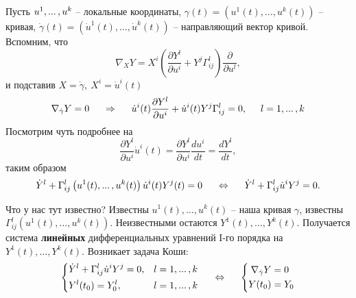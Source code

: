 Пусть $\set{u}{k}$ -- локальные координаты, $\gamma(t) = \left(u^1(t),\ldots,u^k(t)\right)$ -- кривая, $\dot{\gamma}(t) = \left(
    \dot{u}^1(t), \ldots, \dot{u}^k(t)
\right)$ -- направляющий вектор кривой. Вспомним, что
\begin{equation*}
    \nabla_X Y = 
    X^i \left(
        \frac{\partial Y^l}{\partial u^i} + Y^j \Gamma_{ij}^l
    \right) \frac{\partial }{\partial u^l},
\end{equation*}
и подставив $X = \dot{\gamma}, \ X^i = \dot{u}^i (t)$
\begin{equation*}
    \nabla_{\dot{\gamma}} Y = 0
    \hspace{0.5cm} \Rightarrow \hspace{0.5cm} 
    \dot{u}^i (t) \frac{\partial Y^l}{\partial u^i} + \dot{u}^i (t) Y^j \Gamma_{ij}^{l} = 0, \hspace{0.5cm} l = 1, \ldots, k
\end{equation*}
Посмотрим чуть подробнее на
\begin{equation*}
    \frac{\partial Y^l}{\partial u^i}  \dot{u}^i (t) = 
    \frac{\partial Y^l}{\partial u^i} \frac{d u^i}{d t} =
    \frac{d Y^l}{dt}, 
\end{equation*}
таким образом
\begin{equation}
    \dot{Y}^l + \Gamma_{ij}^{l} \left(
         u^1(t), \ldots, u^k(t)
    \right) \dot{u}^i (t) Y^j (t) = 0
    \hspace{0.5cm} \Leftrightarrow \hspace{0.5cm} 
    \dot{Y}^l + \Gamma_{ij}^{l} \dot{u}^i Y^j = 0.
\end{equation}

Что у нас тут известно? Известны $u^1(t), \ldots, u^k(t)$ -- наша кривая $\gamma$, известны $\Gamma_{ij}^{l} (u^1(t), \ldots, u^k(t))$. Неизвестными остаются $Y^1(t), \ldots, Y^k(t)$. Получается система \textbf{линейных} дифференциальных уравнений I-го порядка на  $Y^1(t), \ldots, Y^k(t)$. Возникает задача Коши:
\begin{equation}
    \left\{\begin{aligned}
        &\dot{Y}^l + \Gamma_{ij}^{l} \dot{u}^i Y^j = 0, &l=1,\ldots,k\\
        &Y^l(t_0) = Y_0^l, &l=1,\ldots,k
    \end{aligned}\right.
    \hspace{0.5cm} \Leftrightarrow \hspace{0.5cm} 
    \left\{\begin{aligned}
        \nabla_{\dot{\gamma}} Y &= 0\\
        Y(t_0) &= Y_0
    \end{aligned}\right.
\end{equation}

